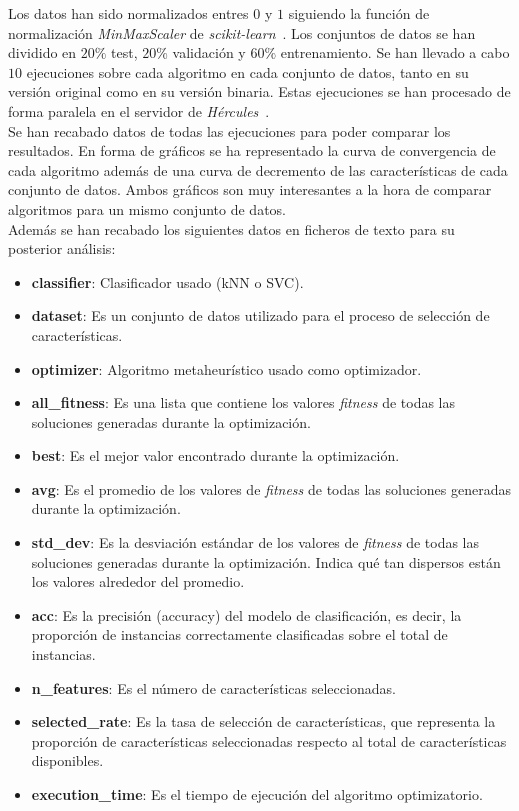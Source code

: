 Los datos han sido normalizados entres $0$ y $1$ siguiendo la función de normalización \textit{MinMaxScaler} de \textit{scikit-learn}~\cite{scikit-learn}. Los conjuntos de datos se han dividido en $20\%$ test, $20\%$ validación y $60\%$ entrenamiento.
Se han llevado a cabo $10$ ejecuciones sobre cada algoritmo en cada conjunto de datos, tanto en su versión original como en su versión binaria. Estas ejecuciones se han procesado de forma paralela en el servidor de \textit{Hércules}~\cite{citicugr}.\\[6pt]
Se han recabado datos de todas las ejecuciones para poder comparar los resultados. En forma de gráficos se ha representado la curva de convergencia de cada algoritmo además de una curva de decremento de las características de cada conjunto de datos. Ambos gráficos son muy interesantes a la hora de comparar algoritmos para un mismo conjunto de datos.\\[6pt]
Además se han recabado los siguientes datos en ficheros de texto para su posterior análisis:
\begin{itemize}
    \item \textbf{classifier}: Clasificador usado (kNN o SVC).
    \item \textbf{dataset}: Es un conjunto de datos utilizado para el proceso de selección de características.
    \item \textbf{optimizer}: Algoritmo metaheurístico usado como optimizador.
    \item \textbf{all\_fitness}: Es una lista que contiene los valores \textit{fitness} de todas las soluciones generadas durante la optimización.
    \item \textbf{best}: Es el mejor valor encontrado durante la optimización.
    \item \textbf{avg}: Es el promedio de los valores de \textit{fitness} de todas las soluciones generadas durante la optimización.
    \item \textbf{std\_dev}: Es la desviación estándar de los valores de \textit{fitness} de todas las soluciones generadas durante la optimización. Indica qué tan dispersos están los valores alrededor del promedio.
    \item \textbf{acc}: Es la precisión (accuracy) del modelo de clasificación, es decir, la proporción de instancias correctamente clasificadas sobre el total de instancias.
    \item \textbf{n\_features}: Es el número de características seleccionadas.
    \item \textbf{selected\_rate}: Es la tasa de selección de características, que representa la proporción de características seleccionadas respecto al total de características disponibles.
    \item \textbf{execution\_time}: Es el tiempo de ejecución del algoritmo optimizatorio.
\end{itemize}
